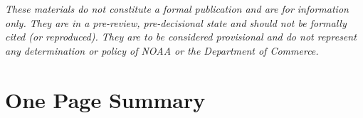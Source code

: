 \documentclass[11pt,
  english,
  a4paper,
]{article}
\begin{document}
\newcommand{\lt}{\ensuremath <}
\newcommand{\gt}{\ensuremath >}

\newlength{\cslhangindent}
\setlength{\cslhangindent}{1.5em}
\newenvironment{cslreferences}%
  {\setlength{\parindent}{0pt}%
  \everypar{\setlength{\hangindent}{\cslhangindent}}\ignorespaces}%
  {\par}

\vspace{20cm}


\emph{These materials do not constitute a formal publication and are for information only. They are in a pre-review, pre-decisional state and should not be formally cited (or reproduced). They are to be considered provisional and do not represent any determination or policy of NOAA or the Department of Commerce.}

\leavevmode\tagmcend\tagstructend\par

\pagebreak
{}
\setcounter{page}{1}

\renewcommand{\thetable}{\roman{table}}
\renewcommand{\thefigure}{\roman{figure}}

\setlength\parskip{0.5em plus 0.1em minus 0.2em}


\hypertarget{one-page-summary}{%
\section*{One Page Summary}\label{one-page-summary}}

\leavevmode\tagmcend\tagstructend
\end{document}
